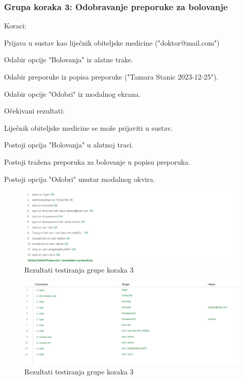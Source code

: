 			 \subsubsection*{Grupa koraka 3: Odobravanje preporuke za bolovanje}
			 Koraci:
			 \begin{packed_enum}
				\item Prijava u sustav kao liječnik obiteljske medicine ("doktor@mail.com")
				\item Odabir opcije "Bolovanja" iz alatne trake.
				\item Odabir preporuke iz popisa preporuke ("Tamara Stanic 2023-12-25").
				\item Odabir opcije "Odobri" iz modalnog ekrana.
			 \end{packed_enum}
			 Očekivani rezultati:
			 \begin{packed_enum}
				\item Liječnik obiteljske medicine se može prijaviti u sustav.
				\item Postoji opcija "Bolovanja" u alatnoj traci.
				\item Postoji tražena preporuka za bolovanje u popisu preporuka.
				\item Postoji opcija "Odobri" unutar modalnog okvira.
			 \end{packed_enum}

			 \begin{figure}[H]
				\includegraphics[width=\textwidth]{slike/selenium3.1.png} 
				\caption{Rezultati testiranja grupe koraka 3} 
			\end{figure}

			\begin{figure}[H]
				\includegraphics[width=\textwidth]{slike/selenium3.2.png} 
				\caption{Rezultati testiranja grupe koraka 3} 
			\end{figure}

